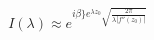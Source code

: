 \documentclass[preview]{standalone}
\begin{document}
\begin{align*}
I(\lambda) \approx e^{i\beta\} e^{\lambda z_0} \sqrt{\frac{2\pi}{\lambda |f''(z_0)|}}}
\end{align*}
\end{document}
